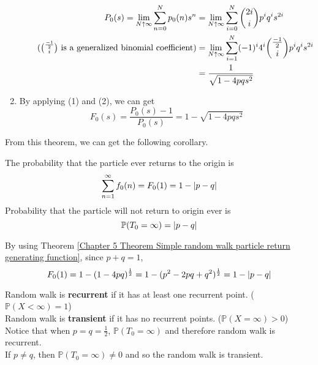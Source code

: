 \documentclass{huhtakm-template-book}
\newcommand{\prob}{\mathbb{P}}
\begin{document}
\begin{proofing}
\begin{enumerate}
        \begin{align*}
            P_{0}(s)=\lim_{N\uparrow\infty}\sum_{n=0}^{N}p_{0}(n)s^{n}&=\lim_{N\uparrow\infty}\sum_{i=0}^{N}\binom{2i}{i}p^{i}q^{i}s^{2i}\\
            \tag{$\binom{\frac{-1}{2}}{i}$ is a generalized binomial coefficient}
            &=\lim_{N\uparrow\infty}\sum_{i=1}^{N}(-1)^{i}4^{i}\binom{\frac{-1}{2}}{i}p^{i}q^{i}s^{2i}\\
            &=\frac{1}{\sqrt{1-4pqs^{2}}}
        \end{align*}
        \item By applying (1) and (2), we can get
        \begin{equation*}
            F_{0}(s)=\frac{P_{0}(s)-1}{P_{0}(s)}=1-\sqrt{1-4pqs^{2}}
        \end{equation*}
    \end{enumerate}
\end{proofing}
From this theorem, we can get the following corollary.
\begin{cor}
    The probability that the particle ever returns to the origin is
    \begin{equation*}
        \sum_{n=1}^{\infty}f_{0}(n)=F_{0}(1)=1-\left|{p-q}\right|
    \end{equation*}
    Probability that the particle will not return to origin ever is
    \begin{equation*}
        \prob(T_{0}=\infty)=\abs{p-q}
    \end{equation*}
\end{cor}
\begin{proofing}
    By using Theorem \ref{Chapter 5 Theorem Simple random walk particle return generating function}, since $p+q=1$,
    \begin{equation*}
        F_{0}(1)=1-(1-4pq)^{\frac{1}{2}}=1-(p^{2}-2pq+q^{2})^{\frac{1}{2}}=1-\left|{p-q}\right|
    \end{equation*}
\end{proofing}
\begin{rem}
    Random walk is \textbf{recurrent} if it has at least one recurrent point. ($\prob(X<\infty)=1$)\\
    Random walk is \textbf{transient} if it has no recurrent points. ($\prob(X=\infty)>0$)\\
    Notice that when $p=q=\frac{1}{2}$, $\prob(T_{0}=\infty)$ and therefore random walk is recurrent.\\
    If $p\neq q$, then $\prob(T_{0}=\infty)\neq 0$ and so the random walk is transient.
\end{rem}
\end{document}

